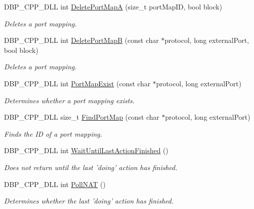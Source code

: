 \begin{DoxyCompactItemize}
DBP\_\-CPP\_\-DLL int \hyperlink{namespacemn_n_a_t_a5be3072a358db533b423765556d75a0e}{DeletePortMapA} (size\_\-t portMapID, bool block)
\begin{DoxyCompactList}\small\item\em Deletes a port mapping. \item\end{DoxyCompactList}\item 
DBP\_\-CPP\_\-DLL int \hyperlink{namespacemn_n_a_t_aaf785d3bc7d1dac4f7be1c350b36d218}{DeletePortMapB} (const char $\ast$protocol, long externalPort, bool block)
\begin{DoxyCompactList}\small\item\em Deletes a port mapping. \item\end{DoxyCompactList}\item 
DBP\_\-CPP\_\-DLL int \hyperlink{namespacemn_n_a_t_add1a4615f05c855773c27df2e6a41496}{PortMapExist} (const char $\ast$protocol, long externalPort)
\begin{DoxyCompactList}\small\item\em Determines whether a port mapping exists. \item\end{DoxyCompactList}\item 
DBP\_\-CPP\_\-DLL size\_\-t \hyperlink{namespacemn_n_a_t_a660dc977a7f695453320530563af6083}{FindPortMap} (const char $\ast$protocol, long externalPort)
\begin{DoxyCompactList}\small\item\em Finds the ID of a port mapping. \item\end{DoxyCompactList}\item 
DBP\_\-CPP\_\-DLL int \hyperlink{namespacemn_n_a_t_ab76572df8f76968a74c1b2af17d5d80a}{WaitUntilLastActionFinished} ()
\begin{DoxyCompactList}\small\item\em Does not return until the last 'doing' action has finished. \item\end{DoxyCompactList}\item 
DBP\_\-CPP\_\-DLL int \hyperlink{namespacemn_n_a_t_a21874523b67217401be26fd7fdca13c8}{PollNAT} ()
\begin{DoxyCompactList}\small\item\em Determines whether the last 'doing' action has finished. \item\end{DoxyCompactList}\end{DoxyCompactItemize}


